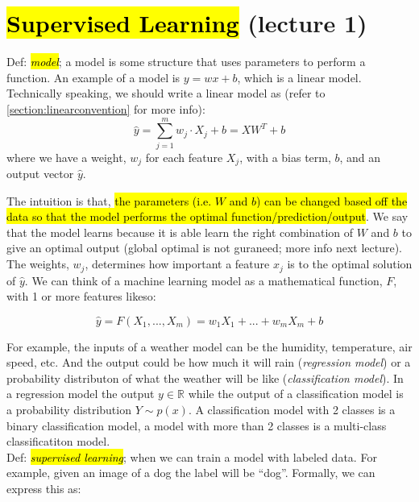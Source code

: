 \documentclass[11pt]{article}
\newcommand{\hlinfo}[1]{{\sethlcolor{lavender}\hl{#1}}}
\begin{document}
\noindent
\section*{}
\subsection*{}

\section{\hl{Supervised Learning} (lecture 1)}
Def: \hl{\emph{model}}; a model is some structure that uses parameters to perform a function. An example of a model is $y= wx + b$, which is a linear model. Technically speaking, we should write a linear model as (refer to \ref{section:linearconvention} for more info):
\[\hat{y} = \sum_{j=1}^{m}{w_j \cdot X_j + b} = XW^{T} + b\]
where we have a weight, $w_j$ for each feature $X_j$, with a bias term, $b$, and an output vector $\hat{y}$. 

The intuition is that, \hlinfo{the parameters (i.e. $W$ and $b$) can be changed based off the data so that the model performs the optimal function/prediction/output}. We say that the model learns because it is able learn the right combination of $W$ and $b$ to give an optimal output (global optimal is not guraneed; more info next lecture). The weights, $w_j$, determines how important a feature $x_j$ is to the optimal solution of $\hat{y}$. We can think of a machine learning model as a mathematical function, $F$, with 1 or more features likeso:

\[\hat{y} = F(X_1, ..., X_m) = w_1 X_1 + ... + w_m X_m + b\]

For example, the inputs of a weather model can be the humidity, temperature, air speed, etc. And the output could be how much it will rain (\emph{regression model}) or a probability distributon of what the weather will be like (\emph{classification model}). In a regression model the output $y \in \mathbb{R}$ while the output of a classification model is a probability distribution $Y \sim p(x)$. A classification model with 2 classes is a binary classification model, a model with more than 2 classes is a multi-class classificatiton model. \\

Def: \hl{\emph{supervised learning}}; when we can train a model with labeled data. For example, given an image of a dog the label will be ``dog''. Formally, we can express this as:
\end{document}
